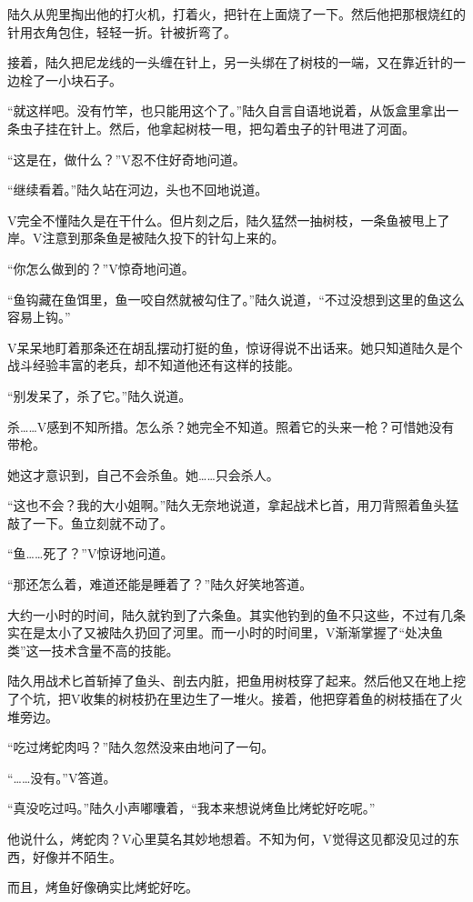 陆久从兜里掏出他的打火机，打着火，把针在上面烧了一下。然后他把那根烧红的针用衣角包住，轻轻一折。针被折弯了。

接着，陆久把尼龙线的一头缠在针上，另一头绑在了树枝的一端，又在靠近针的一边栓了一小块石子。

“就这样吧。没有竹竿，也只能用这个了。”陆久自言自语地说着，从饭盒里拿出一条虫子挂在针上。然后，他拿起树枝一甩，把勾着虫子的针甩进了河面。

“这是在，做什么？”V忍不住好奇地问道。

“继续看着。”陆久站在河边，头也不回地说道。

V完全不懂陆久是在干什么。但片刻之后，陆久猛然一抽树枝，一条鱼被甩上了岸。V注意到那条鱼是被陆久投下的针勾上来的。

“你怎么做到的？”V惊奇地问道。

“鱼钩藏在鱼饵里，鱼一咬自然就被勾住了。”陆久说道，“不过没想到这里的鱼这么容易上钩。”

V呆呆地盯着那条还在胡乱摆动打挺的鱼，惊讶得说不出话来。她只知道陆久是个战斗经验丰富的老兵，却不知道他还有这样的技能。

“别发呆了，杀了它。”陆久说道。

杀……V感到不知所措。怎么杀？她完全不知道。照着它的头来一枪？可惜她没有带枪。

她这才意识到，自己不会杀鱼。她……只会杀人。

“这也不会？我的大小姐啊。”陆久无奈地说道，拿起战术匕首，用刀背照着鱼头猛敲了一下。鱼立刻就不动了。

“鱼……死了？”V惊讶地问道。

“那还怎么着，难道还能是睡着了？”陆久好笑地答道。

大约一小时的时间，陆久就钓到了六条鱼。其实他钓到的鱼不只这些，不过有几条实在是太小了又被陆久扔回了河里。而一小时的时间里，V渐渐掌握了“处决鱼类”这一技术含量不高的技能。

陆久用战术匕首斩掉了鱼头、剖去内脏，把鱼用树枝穿了起来。然后他又在地上挖了个坑，把V收集的树枝扔在里边生了一堆火。接着，他把穿着鱼的树枝插在了火堆旁边。

“吃过烤蛇肉吗？”陆久忽然没来由地问了一句。

“……没有。”V答道。

“真没吃过吗。”陆久小声嘟囔着，“我本来想说烤鱼比烤蛇好吃呢。”

他说什么，烤蛇肉？V心里莫名其妙地想着。不知为何，V觉得这见都没见过的东西，好像并不陌生。

而且，烤鱼好像确实比烤蛇好吃。

\section*{}

